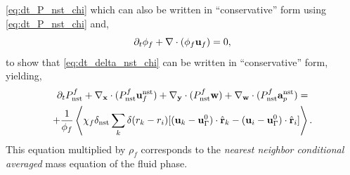 \ref{eq:dt_P_nst_chi} which can also be written in ``conservative'' form using \ref{eq:dt_P_nst_chi} and, 
\begin{equation}
    \partial_t \phi_f 
    + \mathbf{\nabla}\cdot(
        \phi_f
        \textbf{u}_f 
        ) 
    = 0, 
\end{equation}
to show that \ref{eq:dt_delta_nst_chi} can be written in ``conservative'' form, yielding, 
\begin{multline}
    \pddt P_\text{nst}^f
    + 
    \pddx \cdot (
        P_\text{nst}^f
        \textbf{u}_f^\text{nst}
    )
    + \pddy \cdot (
        P_\text{nst}^f
        \textbf{w}
    )
    +
    \pddw \cdot (  
        P_\text{nst}^f
        \textbf{a}_p^\text{nst} 
    )
    = \\
    + \frac{1}{\phi_f}\avg{
     \chi_f \delta_\text{nst}
    \sum_k 
    \delta(r_k - r_i)
    [(\textbf{u}_k - \textbf{u}_\Gamma^0) \cdot \hat{\textbf{r}}_k - (\textbf{u}_i- \textbf{u}_\Gamma^0)  \cdot \hat{\textbf{r}}_i]}.
    \label{eq:dt_Pc_nst_chi}
\end{multline}
This equation multiplied by $\rho_f$ corresponds to the \textit{nearest neighbor conditional averaged} mass equation of the fluid phase. 

